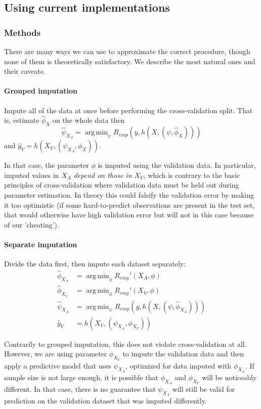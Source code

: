 \documentclass[12pt, a4paper]{memoir}
\DeclareMathOperator*{\argmin}{arg\,min}
\begin{document}
		\subsection{Using current implementations}
			\subsubsection{Methods}
There are many ways we can use to approximate the correct procedure, though none of them is theoretically satisfactory. We describe the most natural ones and their caveats.

\paragraph{Grouped imputation} Impute all of the data at once before performing the cross-validation split. That is, estimate $\hat{\phi}_X$ on the whole data then $$\hat{\psi}_{X_A} = \argmin_{\psi} R_{emp}(y, h(X, (\psi, \hat{\phi}_X)))$$
 and $\hat{y}_V = h(X_V, (\psi_{X_A}, \phi_X))$. 

In that case, the parameter $\phi$ is imputed using the validation data. In particular, imputed values in $X_A$ \emph{depend on those in $X_V$}, which is contrary to the basic principles of cross-validation where validation data must be held out during parameter estimation. In theory this could falsify the validation error by making it too optimistic (if some hard-to-predict observations are present in the test set, that would otherwise have high validation error but will not in this case because of our 'cheating').

\paragraph{Separate imputation}
Divide the data first, then impute each dataset separately:
\begin{align*}
\hat{\phi}_{X_A} &= \argmin_{\phi} R_{emp}'(X_A, \phi) \\
\hat{\phi}_{X_V} &= \argmin_{\phi} R_{emp}'(X_V, \phi) \\
\hat{\psi}_{X_A} &= \argmin_{\psi} R_{emp}(y, h(X, (\psi, \hat{\phi}_{X_A}))) \\
\hat{y}_V &= h(X_V, (\psi_{X_A}, \phi_{X_V}))
\end{align*}

Contrarily to grouped imputation, this does not violate cross-validation at all. However, we are using parameter $\phi_{X_V}$ to impute the validation data and then apply a predictive model that uses $\psi_{X_A}$, optimized for data imputed with $\phi_{X_A}$. If sample size is not large enough, it is possible that $\phi_{X_A}$ and $\phi_{X_V}$ will be noticeably different. In that case, there is no guarantee that $\psi_{X_A}$ will still be valid for prediction on the validation dataset that was imputed differently. 
\end{document}
